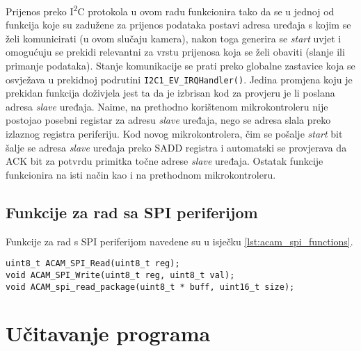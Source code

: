 Prijenos preko I\textsuperscript{2}C protokola u ovom radu funkcionira tako da se u jednoj od funkcija koje su zadužene za prijenos podataka postavi adresa uređaja s kojim se želi komunicirati (u ovom slučaju kamera), nakon toga generira se \textit{start} uvjet i omogućuju se prekidi relevantni za vrstu prijenosa koja se želi obaviti (slanje ili primanje podataka). Stanje komunikacije se prati preko globalne zastavice koja se osvježava u prekidnoj podrutini \verb|I2C1_EV_IRQHandler()|. Jedina promjena koju je prekidan funkcija doživjela jest ta da je izbrisan kod za provjeru je li poslana adresa \textit{slave} uređaja. Naime, na prethodno korištenom mikrokontroleru nije postojao posebni registar za adresu \textit{slave} uređaja, nego se adresa slala preko izlaznog registra periferiju. Kod novog mikrokontrolera, čim se pošalje \textit{start} bit šalje se adresa \textit{slave} uređaja preko SADD registra i automatski se provjerava da ACK bit za potvrdu primitka točne adrese \textit{slave} uređaja. Ostatak funkcije funkcionira na isti način kao i na prethodnom mikrokontroleru.

\subsection{Funkcije za rad sa SPI periferijom}

Funkcije za rad s SPI periferijom navedene su u isječku \ref{lst:acam_spi_functions}.

\begin{lstlisting}[caption=Funkcije za rad s SPI periferijom, label={lst:acam_spi_functions}]
uint8_t ACAM_SPI_Read(uint8_t reg);
void ACAM_SPI_Write(uint8_t reg, uint8_t val);
void ACAM_spi_read_package(uint8_t * buff, uint16_t size);
\end{lstlisting}

\section{Učitavanje programa}

